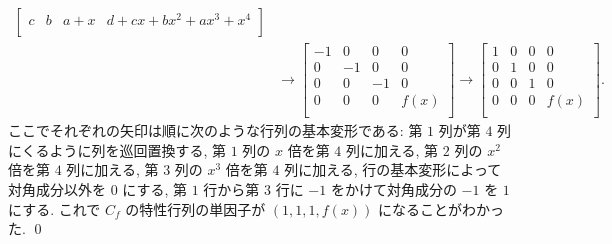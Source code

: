\documentclass[12pt,twoside]{jarticle}
\begin{document}
\begin{align*}
\begin{bmatrix}
     c &  b & a+x & d+cx+bx^2+ax^3+x^4\\
  \end{bmatrix}
  \\ &
  \to
  \begin{bmatrix}
    -1 &  0 &  0 & 0 \\
     0 & -1 &  0 & 0 \\
     0 &  0 & -1 & 0 \\
     0 &  0 &  0 & f(x) \\
  \end{bmatrix}
  \to
  \begin{bmatrix}
    1 & 0 & 0 & 0 \\
    0 & 1 & 0 & 0 \\
    0 & 0 & 1 & 0 \\
    0 & 0 & 0 & f(x) \\
  \end{bmatrix}.
\end{align*}
ここでそれぞれの矢印は順に次のような行列の基本変形である:
第 $1$ 列が第 $4$ 列にくるように列を巡回置換する,
第 $1$ 列の $x$ 倍を第 $4$ 列に加える,
第 $2$ 列の $x^2$ 倍を第 $4$ 列に加える,
第 $3$ 列の $x^3$ 倍を第 $4$ 列に加える,
行の基本変形によって対角成分以外を $0$ にする,
第 $1$ 行から第 $3$ 行に $-1$ をかけて対角成分の $-1$ を $1$ にする.
これで $C_f$ の特性行列の単因子が $(1,1,1,f(x))$ になることがわかった.
\qed

\end{document}
